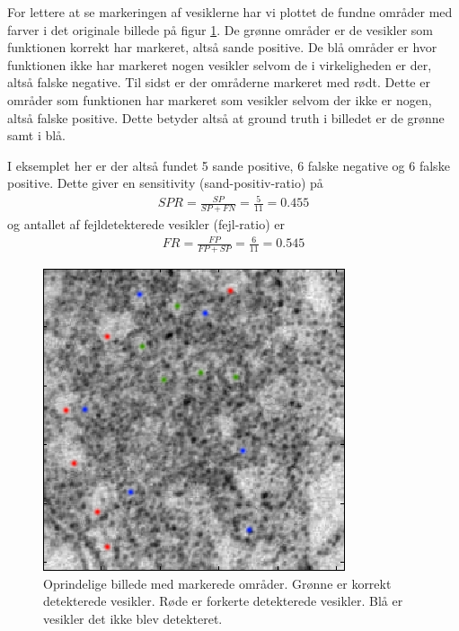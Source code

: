 For lettere at se markeringen af vesiklerne har vi plottet de fundne områder med farver i det originale billede på figur \ref{fig:postmethod_conv_photoshop}. De grønne områder er de vesikler som funktionen korrekt har markeret, altså sande positive. De blå områder er hvor funktionen ikke har markeret nogen vesikler selvom de i virkeligheden er der, altså falske negative. Til sidst er der områderne markeret med rødt. Dette er områder som funktionen har markeret som vesikler selvom der ikke er nogen, altså falske positive. Dette betyder altså at ground truth i billedet er de grønne samt i blå.

I eksemplet her er der altså fundet 5 sande positive, 6 falske negative og 6 falske positive. Dette giver en sensitivity (sand-positiv-ratio) på
\begin{align}
	SPR = \frac{SP}{SP+FN} = \frac{5}{11} = 0.455
\end{align}
og antallet af fejldetekterede vesikler (fejl-ratio) er
\begin{align}
	FR = \frac{FP}{FP+SP} = \frac{6}{11} = 0.545
\end{align}

\begin{figure}[H]
		\centering
		\includegraphics[scale=0.65]{files/postmethod/img/conv_5.png}
	\caption{Oprindelige billede med markerede områder. Grønne er korrekt detekterede vesikler. Røde er forkerte detekterede vesikler. Blå er vesikler det ikke blev detekteret.\label{fig:postmethod_conv_photoshop}}
\end{figure}

